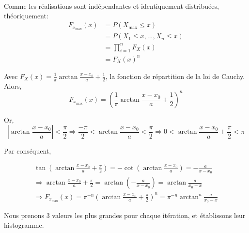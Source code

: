 \documentclass[12pt,a4paper,titlepage]{article}
\numberwithin{equation}{section}
\begin{document}
Comme les réalisations sont indépendantes et identiquement distribuées, théoriquement:
\begin{align*}
{F_{{x_{\max }}}}\left( x \right) & = P\left( {{X_{\max }} \le x} \right)\\
&  = P\left( {{X_1} \le x,...,{X_n} \le x} \right)\\
 & = \prod\limits_{i = 1}^n {{F_X}\left( x \right)} \\
 & = {F_X}{\left( x \right)^n}
\end{align*}

Avec ${F_X}\left( x \right) = \frac{1}{\pi }\arctan \frac{{x - {x_0}}}{a} + \frac{1}{2}$, la fonction de répartition de la loi de Cauchy. Alors, \[{F_{{x_{\max }}}}\left( x \right) = {\left( {\frac{1}{\pi }\arctan \frac{{x - {x_0}}}{a} + \frac{1}{2}} \right)^n}\]

Or, \[\left| {\arctan \frac{{x - {x_0}}}{a}} \right| < \frac{\pi }{2} \Rightarrow \frac{{ - \pi }}{2} < \arctan \frac{{x - {x_0}}}{a} < \frac{\pi }{2} \Rightarrow 0 < \arctan \frac{{x - {x_0}}}{a} + \frac{\pi }{2} < \pi \]

Par conséquent,

\[\begin{array}{l}
\tan \left( {\arctan \frac{{x - {x_0}}}{a} + \frac{\pi }{2}} \right) =  - \cot \left( {\arctan \frac{{x - {x_0}}}{a}} \right) =  - \frac{a}{{x - {x_0}}}\\
 \Rightarrow \arctan \frac{{x - {x_0}}}{a} + \frac{\pi }{2} = \arctan \left( { - \frac{a}{{x - {x_0}}}} \right) = \arctan \frac{a}{{{x_0} - x}}\\
 \Rightarrow {F_{{x_{\max }}}}\left( x \right) = {\pi ^{ - n}}{\left( {\arctan \frac{{x - {x_0}}}{a} + \frac{\pi }{2}} \right)^n} = {\pi ^{ - n}}{\arctan ^n}\frac{a}{{{x_0} - x}}
\end{array}\]
\clearpage

Nous prenons 3 valeurs les plus grandes pour chaque itération, et établissons leur histogramme.

\end{document}
